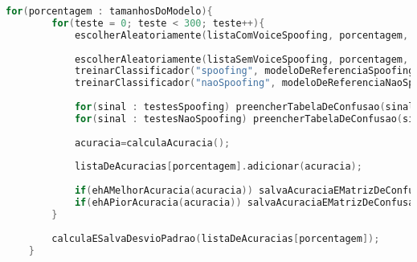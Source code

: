 \begin{lstlisting}[language=C++]
	for(porcentagem : tamanhosDoModelo){
		for(teste = 0; teste < 300; teste++){
			escolherAleatoriamente(listaComVoiceSpoofing, porcentagem, modeloDeReferenciaSpoofing, testesSpoofing);
			
			escolherAleatoriamente(listaSemVoiceSpoofing, porcentagem, modeloDeReferenciaNaoSpoofing, testesNaoSpoofing);
			treinarClassificador("spoofing", modeloDeReferenciaSpoofing);
			treinarClassificador("naoSpoofing", modeloDeReferenciaNaoSpoofing);
			
			for(sinal : testesSpoofing)	preencherTabelaDeConfusao(sinal, "spoofing");
			for(sinal : testesNaoSpoofing) preencherTabelaDeConfusao(sinal, "naoSpoofing");
			
			acuracia=calculaAcuracia();
			
			listaDeAcuracias[porcentagem].adicionar(acuracia);
			
			if(ehAMelhorAcuracia(acuracia)) salvaAcuraciaEMatrizDeConfusao();
			if(ehAPiorAcuracia(acuracia)) salvaAcuraciaEMatrizDeConfusao();
		}
		
		calculaESalvaDesvioPadrao(listaDeAcuracias[porcentagem]);
	}			
\end{lstlisting}